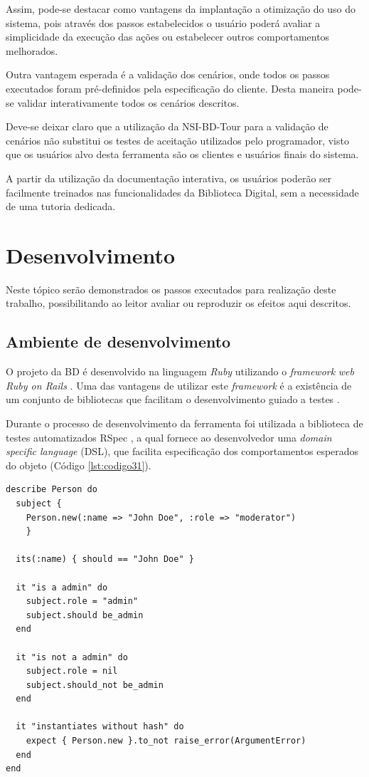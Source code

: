 Assim, pode-se destacar como vantagens da implantação a otimização do uso do sistema, pois através dos passos estabelecidos o usuário poderá avaliar a simplicidade da execução das ações ou estabelecer outros comportamentos melhorados.

Outra vantagem esperada é a validação dos cenários, onde todos os passos executados foram pré-definidos pela especificação do cliente. Desta maneira pode-se validar interativamente todos os cenários descritos.

Deve-se deixar claro que a utilização da NSI-BD-Tour para a validação de cenários não substitui os testes de aceitação utilizados pelo programador, visto que os usuários alvo desta ferramenta são os clientes e usuários finais do sistema.

A partir da utilização da documentação interativa, os usuários poderão ser facilmente treinados nas funcionalidades da Biblioteca Digital, sem a necessidade de uma tutoria dedicada.

\section{Desenvolvimento}

Neste tópico serão demonstrados os passos executados para realização deste trabalho, possibilitando ao leitor avaliar ou reproduzir os efeitos aqui descritos.

\subsection{Ambiente de desenvolvimento}

O projeto da BD é desenvolvido na linguagem \textit{Ruby} utilizando o \textit{framework} \textit{web Ruby on Rails} \cite{RAILS}. Uma das vantagens de utilizar este \textit{framework} é a existência de um conjunto de bibliotecas que facilitam o desenvolvimento guiado a testes \cite{BECK}.

\pagebreak

Durante o processo de desenvolvimento da ferramenta foi utilizada a biblioteca de testes automatizados RSpec \cite{CHELIMSKY}, a qual fornece ao desenvolvedor uma \textit{domain specific language} (DSL), que facilita especificação dos comportamentos esperados do objeto (Código \ref{lst:codigo31}).

{\singlespace
\begin{lstlisting}[caption=Exemplo da DSL do Rspec,label={lst:codigo31}]
describe Person do
  subject {
    Person.new(:name => "John Doe", :role => "moderator")
    }

  its(:name) { should == "John Doe" }

  it "is a admin" do
    subject.role = "admin"
    subject.should be_admin
  end

  it "is not a admin" do
    subject.role = nil
    subject.should_not be_admin
  end

  it "instantiates without hash" do
    expect { Person.new }.to_not raise_error(ArgumentError)
  end
end
\end{lstlisting}
}

